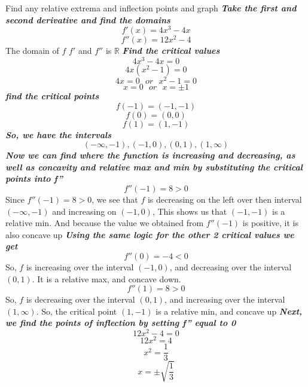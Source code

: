 \documentclass{report}
\begin{document}
\pagebreak
\q
Find any relative extrema and inflection points and graph
\bigbreak \noindent
\textit{\textbf{Take the first and second derivative and find the domains}}
$$f'(x) = 4x^3 - 4x$$
$$ f''(x) = 12x^2 - 4$$
The domain of $f$ $f'$ and $f''$ is $\mathbb{R}$
\bigbreak \noindent
\textit{\textbf{Find the critical values}}
$$ 4x^3 - 4x = 0$$
$$ 4x(x^2 - 1) = 0$$
$$ 4x = 0 \ \ \ or \ \ \ x^2 -1=0$$
$$x = 0 \ \ \ or \ \ \ x=\pm1$$
\textit{\textbf{find the critical points}}
$$ f(-1) = (-1,-1)$$
$$ f(0) = (0,0)$$
$$ f(1) = (1,-1)$$
\textit{\textbf{So, we have the intervals}}
$$ (-\infty, -1), (-1,0), (0,1), (1,\infty)$$
\textit{\textbf{Now we can find where the function is increasing and decreasing, as well as concavity and relative max and min by substituting the critical points into f''}}
$$f''(-1) = 8 > 0$$
Since $f''(-1) = 8 > 0$, we see that $f$ is decreasing on the left over then interval $(-\infty, -1)$ and increasing on $(-1,0)$, This shows us that $(-1,-1)$ is a relative min. And because the value we obtained from $f''(-1)$ is positive, it is also concave up
\textit{\textbf{Using the same logic for the other 2 critical values we get}}
$$ f''(0) = -4 < 0$$
So, $f$ is increasing over the interval $(-1,0)$, and decreasing over the interval $(0,1)$. It is a relative max, and concave down.
\bigbreak \noindent
$$ f''(1) = 8 > 0$$
So, $f$ is decreasing over the interval $(0,1)$, and increasing over the interval $(1,\infty)$. So, the critical point $(1,-1)$ is a relative min, and concave up
\bigbreak \noindent
\textit{\textbf{Next, we find the points of inflection by setting f'' equal to 0}}
$$ 12x^2 - 4 = 0$$
$$ 12x^2 = 4$$
$$ x^2 = \dfrac{1}{3}$$
$$ x = \pm\sqrt{\dfrac{1}{3}}$$
\end{document}
